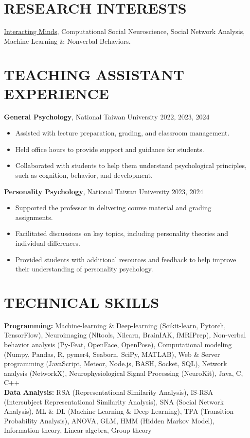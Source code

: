 \documentclass[a4paper,12pt]{article}
\newcommand{\sectionspace}{0pt} %
\newcommand{\itemspace}{7pt} %
\begin{document}
\vspace{\sectionspace}

\section*{RESEARCH INTERESTS}
\href{https://www.interactingminds.com}{Interacting Minds}, Computational Social Neuroscience, Social Network Analysis, Machine Learning \& Nonverbal Behaviors. \\[\sectionspace]

\vspace{\sectionspace}

\section*{TEACHING ASSISTANT EXPERIENCE}

\noindent\textbf{General Psychology}, National Taiwan University  \hfill 2022, 2023, 2024
\begin{itemize}
    \item Assisted with lecture preparation, grading, and classroom management.
    \item Held office hours to provide support and guidance for students.
    \item Collaborated with students to help them understand psychological principles, such as cognition, behavior, and development.
\end{itemize}

\noindent\textbf{Personality Psychology}, National Taiwan University \hfill 2023, 2024
\begin{itemize}
    \item Supported the professor in delivering course material and grading assignments.
    \item Facilitated discussions on key topics, including personality theories and individual differences.
    \item Provided students with additional resources and feedback to help improve their understanding of personality psychology.
\end{itemize}

\vspace{7pt}

\section*{TECHNICAL SKILLS}
\textbf{Programming:} Machine-learning \& Deep-learning (Scikit-learn, Pytorch, TensorFlow), Neuroimaging (Nltools, Nilearn, BrainIAK, fMRIPrep), Non-verbal behavior analysis (Py-Feat, OpenFace, OpenPose), Computational modeling (Numpy, Pandas, R, pymer4, Seaborn, SciPy, MATLAB), Web \& Server programming (JavaScript, Meteor, Node.js, BASH, Socket, SQL), Network analysis (NetworkX), Neurophysiological Signal Processing (NeuroKit), Java, C, C++ \\[\itemspace]
\noindent\textbf{Data Analysis:} RSA (Representational Similarity Analysis), IS-RSA (Intersubject Representational Similarity Analysis), SNA (Social Network Analysis), ML \& DL (Machine Learning \& Deep Learning), TPA (Transition Probability Analysis), ANOVA, GLM, HMM (Hidden Markov Model), Information theory, Linear algebra, Group theory

\thispagestyle{lastupdate}
\end{document}
